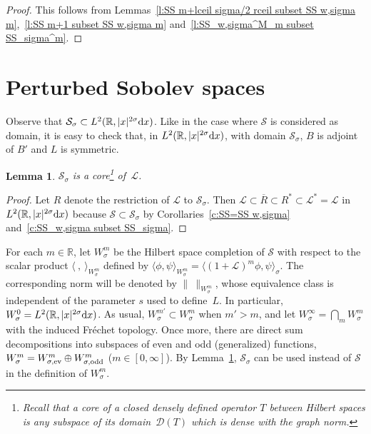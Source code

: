 \documentclass[11pt]{article}
\newtheorem{Lemma}[Theorem]{Lemma}
\newcommand{\R}{\mathbb{R}}
\newcommand{\DD}{\mathcal{D}}
\newcommand{\LL}{\mathcal{L}}
\renewcommand{\SS}{\mathcal{S}}
\begin{document}
\begin{proof}
  This follows from Lemmas~\ref{l:SS m+lceil sigma/2 rceil subset SS w,sigma m},~\ref{l:SS m+1 subset SS w,sigma m} and~\ref{l:SS_w,sigma^M_m subset SS_sigma^m}.
\end{proof}



\section{Perturbed Sobolev spaces}\label{s:W sigma m}

Observe that $\SS_\sigma\subset L^2(\R,|x|^{2\sigma}{\rm d}x)$. Like in the case where $\SS$ is considered as domain, it is easy to check that, in $L^2(\R,|x|^{2\sigma}{\rm d}x)$, with domain $\SS_\sigma$, $B$ is adjoint of $B'$ and $L$ is symmetric.

\begin{Lemma}\label{l:SS_sigma is a core of LL}
   $\SS_\sigma$ is a core\footnote{Recall that a {\em core\/} of a closed densely def\/ined operator $T$ between Hilbert spaces is any subspace of its domain~$\DD(T)$ which is dense with the graph norm.} of~$\LL$.
\end{Lemma}

\begin{proof}
  Let $R$ denote the restriction of $\LL$ to $\SS_\sigma$. Then $\LL\subset\overline{R}\subset R^*\subset\LL^*=\LL$ in $L^2(\R,|x|^{2\sigma}{\rm d}x)$ because $\SS\subset\SS_\sigma$ by Corollaries~\ref{c:SS=SS w,sigma} and~\ref{c:SS_w,sigma subset SS_sigma}.
\end{proof}

For each $m\in\R$, let $W_\sigma^m$ be the Hilbert space completion of $\SS$ with respect to the scalar product $\langle\ ,\ \rangle_{W_\sigma^m}$ def\/ined by $\langle\phi,\psi\rangle_{W_\sigma^m}=\langle(1+\LL)^m\phi,\psi\rangle_\sigma$. The corresponding norm will be denoted by $\|\ \|_{W_\sigma^m}$,
whose equivalence class is independent of the parameter $s$ used to def\/ine~$L$. In particular,
$W_\sigma^0=L^2(\R,|x|^{2\sigma}{\rm d}x)$. As usual, $W_\sigma^{m'}\subset
W_\sigma^m$ when $m'>m$,  and let
$W_\sigma^\infty=\bigcap_mW_\sigma^m$ with the
induced Fr\'echet topology. Once more, there are direct sum decompositions into subspaces of even and odd (generalized) functions, $W_\sigma^m=W_{\sigma,\text{\rm ev}}^m\oplus W_{\sigma,\text{\rm odd}}^m$ ($m\in[0,\infty]$). By Lemma~\ref{l:SS_sigma is a core of LL}, $\SS_\sigma$ can be used instead of $\SS$ in the def\/inition of $W_\sigma^m$.
\end{document}
